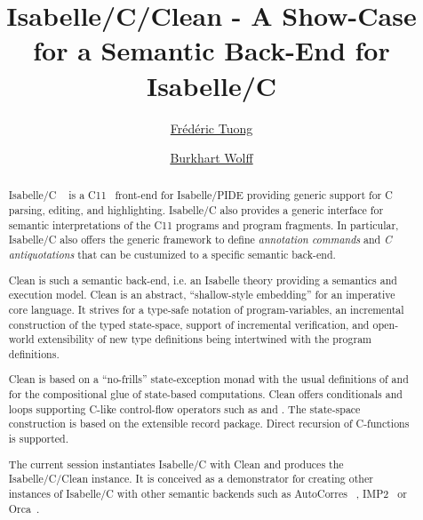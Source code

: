 \documentclass[fontsize=11pt,paper=a4,open=right,twoside,abstract=true]{scrreprt}
\begin{document}
\title{Isabelle/C/Clean - A Show-Case for a Semantic Back-End for Isabelle/C}
\author{%
  \href{https://www.lri.fr/~ftuong/}{Fr\'ed\'eric Tuong}
  \and
  \href{https://www.lri.fr/~wolff/}{Burkhart Wolff}}
\publishers{%
  \mbox{LRI, Univ. Paris-Sud, CNRS, Universit\'e Paris-Saclay} \\
  b\^at. 650 Ada Lovelace, 91405 Orsay, France \texorpdfstring{\\}{}
}

\maketitle

\begin{abstract}
Isabelle/C ~\cite{TuongWolff19} is a C11 ~front-end for Isabelle/PIDE providing 
generic support for C parsing, editing, and highlighting. Isabelle/C also provides 
a generic interface for semantic interpretations of the C11 programs and program
fragments. In particular, Isabelle/C also offers the generic framework
to define \emph{annotation commands} and \emph{C antiquotations} 
that can be custumized to a specific semantic back-end.

Clean is such a semantic back-end, i.e. an Isabelle theory providing a
semantics and execution model. Clean is an abstract, ``shallow-style embedding''  
for an imperative core language. It strives for a type-safe notation of 
program-variables, an incremental construction of the typed state-space, 
support of incremental verification, and  open-world extensibility of new 
type definitions being intertwined with the program definitions.

Clean is based on a ``no-frills'' state-exception monad with the usual definitions 
of  and  for the compositional glue of state-based computations. 
Clean offers conditionals and loops supporting C-like control-flow operators such 
as  and . The state-space construction is based on the 
extensible record package. Direct recursion of C-functions is supported.

The current session instantiates Isabelle/C with Clean and produces the 
Isabelle/C/Clean instance. It is conceived as a demonstrator for creating
other instances of Isabelle/C with other semantic backends such as AutoCorres
~\cite{DBLP:conf/pldi/GreenawayLAK14},
IMP2~\cite{DBLP:journals/afp/LammichW19} or Orca~\cite{bockenek:hal-02069705}.
\end{abstract}

\newpage
\tableofcontents
\end{document}
